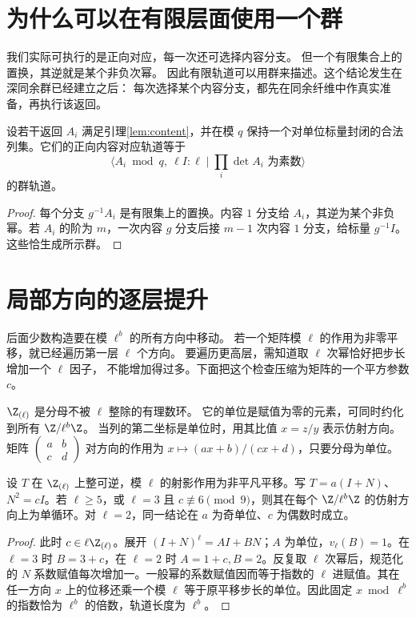 \section{为什么可以在有限层面使用一个群}
我们实际可执行的是正向对应，每一次还可选择内容分支。
但一个有限集合上的置换，其逆就是某个非负次幂。
因此有限轨道可以用群来描述。这个结论发生在深同余群已经建立之后：
每次选择某个内容分支，都先在同余纤维中作真实准备，再执行该返回。

\begin{corollary}[有限正向对应的群化]\label{cor:finite-group}
设若干返回 $A_i$ 满足引理\ref{lem:content}，并在模 $q$ 保持一个对单位标量封闭的合法列集。它们的正向内容对应轨道等于
\[
\langle A_i\bmod q,\ \ell I:\ell\mid\prod_i\det A_i\text{ 为素数}\rangle
\]
的群轨道。
\end{corollary}
\begin{proof}
每个分支 $g^{-1}A_i$ 是有限集上的置换。内容 $1$ 分支给 $A_i$，其逆为某个非负幂。若 $A_i$ 的阶为 $m$，一次内容 $g$ 分支后接 $m-1$ 次内容 $1$ 分支，给标量 $g^{-1}I$。这些恰生成所示群。
\end{proof}


\section{局部方向的逐层提升}
后面少数构造要在模 $\ell^b$ 的所有方向中移动。
若一个矩阵模 $\ell$ 的作用为非零平移，就已经遍历第一层 $\ell$ 个方向。
要遍历更高层，需知道取 $\ell$ 次幂恰好把步长增加一个 $\ell$ 因子，
不能增加得过多。下面把这个检查压缩为矩阵的一个平方参数 $c$。

\begin{definition}[局部整数]
$\Z_{(\ell)}$ 是分母不被 $\ell$ 整除的有理数环。
它的单位是赋值为零的元素，可同时约化到所有 $\Z/\ell^b\Z$。
当列的第二坐标是单位时，用其比值 $x=z/y$ 表示仿射方向。
矩阵 $\left(\begin{smallmatrix}a&b\\c&d\end{smallmatrix}\right)$ 对方向的作用为
$x\mapsto(ax+b)/(cx+d)$，只要分母为单位。
\end{definition}

\begin{lemma}[局部平移的逐层提升]\label{lem:local-cycle}
设 $T$ 在 $\Z_{(\ell)}$ 上整可逆，模 $\ell$ 的射影作用为非平凡平移。写 $T=a(I+N)$、$N^2=cI$。若 $\ell\ge5$，或 $\ell=3$ 且 $c\not\equiv6\pmod9$，则其在每个 $\Z/\ell^b\Z$ 的仿射方向上为单循环。对 $\ell=2$，同一结论在 $a$ 为奇单位、$c$ 为偶数时成立。
\end{lemma}
\begin{proof}
此时 $c\in\ell\Z_{(\ell)}$。展开 $(I+N)^\ell=A I+B N$；$A$ 为单位，$v_\ell(B)=1$。在 $\ell=3$ 时 $B=3+c$，在 $\ell=2$ 时 $A=1+c,B=2$。反复取 $\ell$ 次幂后，规范化的 $N$ 系数赋值每次增加一。一般幂的系数赋值因而等于指数的 $\ell$ 进赋值。其在任一方向 $x$ 上的位移还乘一个模 $\ell$ 等于原平移步长的单位。因此固定 $x\bmod\ell^b$ 的指数恰为 $\ell^b$ 的倍数，轨道长度为 $\ell^b$。
\end{proof}



